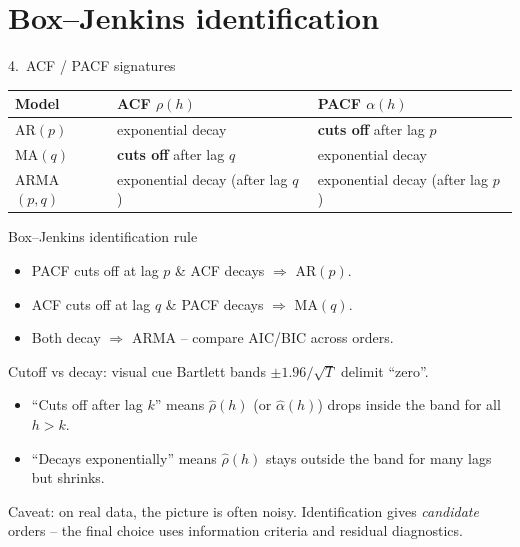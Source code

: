 \documentclass[aspectratio=169]{beamer}
\begin{document}
\section{Box--Jenkins identification}

\begin{frame}{4.~ACF / PACF signatures}
  \begin{center}
  \renewcommand{\arraystretch}{1.4}
  \begin{tabular}{lll}
  \toprule
  Model       & ACF $\rho(h)$         & PACF $\alpha(h)$ \\
  \midrule
  AR$(p)$     & exponential decay     & \textbf{cuts off} after lag $p$ \\
  MA$(q)$     & \textbf{cuts off} after lag $q$ & exponential decay \\
  ARMA$(p,q)$ & exponential decay (after lag $q$) & exponential decay (after lag $p$) \\
  \bottomrule
  \end{tabular}
  \end{center}
  \vspace{0.2cm}
  \pause
  \begin{block}{Box--Jenkins identification rule}
    \begin{itemize}
      \item PACF cuts off at lag $p$ \& ACF decays $\Rightarrow$ AR$(p)$.
      \item ACF cuts off at lag $q$ \& PACF decays $\Rightarrow$ MA$(q)$.
      \item Both decay $\Rightarrow$ ARMA -- compare AIC/BIC across orders.
    \end{itemize}
  \end{block}
\end{frame}

\begin{frame}{Cutoff vs decay: visual cue}
  Bartlett bands $\pm 1.96/\sqrt{T}$ delimit ``zero''.
  \begin{itemize}
    \item ``Cuts off after lag $k$'' means
          $\widehat\rho(h)$ (or $\widehat\alpha(h)$) drops inside the
          band for all $h > k$.
    \item ``Decays exponentially'' means $\widehat\rho(h)$ stays
          outside the band for many lags but shrinks.
  \end{itemize}
  \pause
  \alert{Caveat:} on real data, the picture is often noisy.
  Identification gives \emph{candidate} orders -- the final choice
  uses information criteria and residual diagnostics.
\end{frame}
\end{document}
